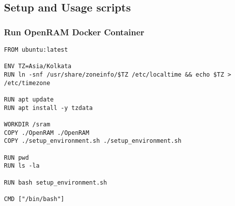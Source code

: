 
\subsection{Setup and Usage scripts}

\subsubsection{Run OpenRAM Docker Container}
\begin{verbatim}
FROM ubuntu:latest 

ENV TZ=Asia/Kolkata
RUN ln -snf /usr/share/zoneinfo/$TZ /etc/localtime && echo $TZ > /etc/timezone

RUN apt update
RUN apt install -y tzdata

WORKDIR /sram 
COPY ./OpenRAM ./OpenRAM
COPY ./setup_environment.sh ./setup_environment.sh

RUN pwd
RUN ls -la

RUN bash setup_environment.sh

CMD ["/bin/bash"]
\end{verbatim}

